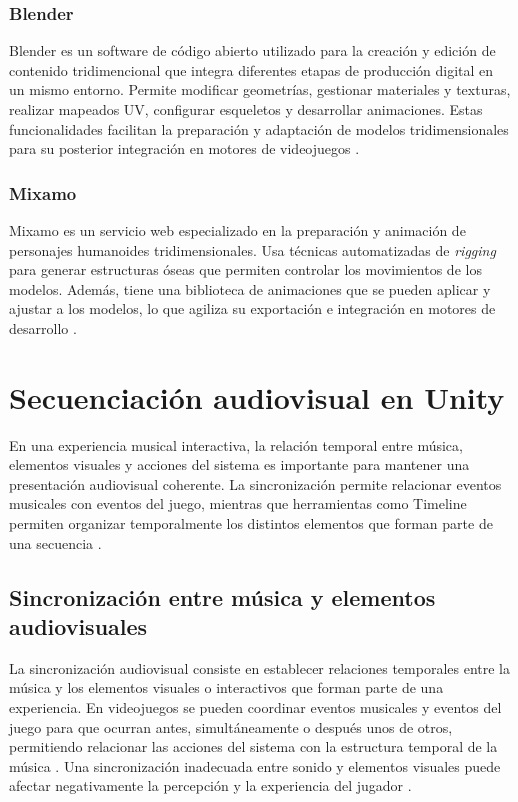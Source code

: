 \subsubsection{Blender}
Blender es un software de código abierto utilizado para la creación y edición de contenido tridimencional que integra diferentes etapas de producción digital en un mismo entorno. Permite modificar geometrías, gestionar materiales y texturas, realizar mapeados UV, configurar esqueletos y desarrollar animaciones. Estas funcionalidades facilitan la preparación y adaptación de modelos tridimensionales para su posterior integración en motores de videojuegos \cite{blender2026manual}.
\subsubsection{Mixamo}
Mixamo es un servicio web especializado en la preparación y animación de personajes humanoides tridimensionales. Usa técnicas automatizadas de \emph{rigging} para generar estructuras óseas que permiten controlar los movimientos de los modelos. Además, tiene una biblioteca de animaciones que se pueden aplicar y ajustar a los modelos, lo que agiliza su exportación e integración en motores de desarrollo \cite{adobe2026mixamo}.

% 
\section{Secuenciación audiovisual en Unity}
En una experiencia musical interactiva, la relación temporal entre música, elementos visuales y acciones del sistema es importante para mantener una presentación audiovisual coherente. La sincronización permite relacionar eventos musicales con eventos del juego, mientras que herramientas como Timeline permiten organizar temporalmente los distintos elementos que forman parte de una secuencia \cite{van2003gamepulse,chen2022synchronization,unity2026timeline}.
\subsection{Sincronización entre música y elementos audiovisuales}
La sincronización audiovisual consiste en establecer relaciones temporales entre la música y los elementos visuales o interactivos que forman parte de una experiencia. En videojuegos se pueden coordinar eventos musicales y eventos del juego para que ocurran antes, simultáneamente o después unos de otros, permitiendo relacionar las acciones del sistema con la estructura temporal de la música \cite{van2003gamepulse}. Una sincronización inadecuada entre sonido y elementos visuales puede afectar negativamente la percepción y la experiencia del jugador \cite{chen2022synchronization}.
